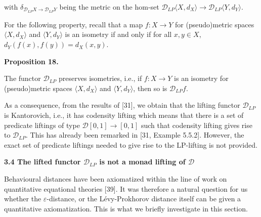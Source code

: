 with $\delta_{\mathcal{D}_{LP}X\to\mathcal{D}_{LP}Y}$ being the metric on the hom-set $\mathcal{D}_{LP}\langle X,d_{X}\rangle\to\mathcal{D}_{LP}\langle Y,d_{Y}\rangle$.\par
 
 
 
 
For the following property, recall that a map $f\colon X\to Y$ for (pseudo)metric spaces $\langle X,d_{X}\rangle$ and $\langle Y,d_{Y}\rangle$ is an isometry if and only if for all $x,y\in X$, $d_{Y}(f(x),f(y))=d_{X}(x,y)$.\par
 
 
 
\par\medskip\noindent\textbf{Proposition 18.}\par
 
 
The functor $\mathcal{D}_{LP}$ preserves isometries, i.e., if $f\colon X\to Y$ is an isometry for (pseudo)metric spaces $\langle X,d_{X}\rangle$ and $\langle Y,d_{Y}\rangle$, then so is $\mathcal{D}_{LP}f$.\par
 
 
 
 
As a consequence, from the results of [31], we obtain that the lifting functor $\mathcal{D}_{LP}$ is Kantorovich, i.e., it has codensity lifting which means that there is a set of predicate liftings of type $\mathcal{D}[0,1]\to[0,1]$ such that codensity lifting gives rise to $\mathcal{D}_{LP}$. This has already been remarked in [31, Example 5.5.2]. However, the exact set of predicate liftings needed to give rise to the LP-lifting is not provided.\par
 
 
 
 
\par\medskip\noindent\textbf{3.4 The lifted functor $\mathcal{D}_{LP}$ is not a monad lifting of $\mathcal{D}$}\par
 
 
Behavioural distances have been axiomatized within the line of work on quantitative equational theories [39]. It was therefore a natural question for us whether the $\varepsilon$-distance, or the Lévy-Prokhorov distance itself can be given a quantitative axiomatization. This is what we briefly investigate in this section.\par
 
